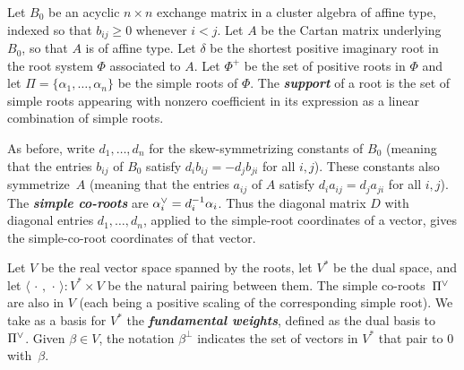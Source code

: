 \documentclass[10pt]{article}
\theoremstyle{definition}
\theoremstyle{remark}
\numberwithin{equation}{section}
\newcommand{\newword}[1]{\textbf{\emph{#1}}}
\newcommand{\ep}{\varepsilon}
\newcommand{\set}[1]{{\lbrace #1 \rbrace}}
\newcommand{\br}[1]{{\langle #1 \rangle}}
\newcommand{\ck}{\spcheck}
\newcommand{\0}{{\mathbf{0}}}
\newcommand{\tB}{{\widetilde{B}}}
\newcommand{\symmetrizer}{{D}}
\newcommand{\RSChar}{\Phi}
\newcommand{\RS}{\RSChar}
\newcommand{\RSpos}{\RS^+}
\newcommand{\SimplesChar}{\Pi}
\newcommand{\Simples}{\SimplesChar}
\begin{document}
Let $B_0$ be an acyclic $n\times n$ exchange matrix in a cluster algebra of affine type, indexed so that $b_{ij}\ge0$ whenever $i<j$.
Let $A$ be the Cartan matrix underlying $B_0$, so that $A$ is of affine type.
Let $\delta$ be the shortest positive imaginary root in the root system $\RS$ associated to $A$.
Let $\RSpos$ be the set of positive roots in $\RS$ and let $\Simples=\set{\alpha_1,\ldots,\alpha_n}$ be the simple roots of $\RS$.
The \newword{support} of a root is the set of simple roots appearing with nonzero coefficient in its expression as a linear combination of simple roots.

As before, write $d_1,\ldots,d_n$ for the skew-symmetrizing constants of $B_0$ (meaning that the entries $b_{ij}$ of $B_0$ satisfy $d_i b_{ij}=-d_j b_{ji}$ for all $i,j$).
These constants also symmetrize~$A$ (meaning that the entries $a_{ij}$ of $A$ satisfy $d_i a_{ij}=d_j a_{ji}$ for all $i,j$).
The \newword{simple co-roots} are $\alpha_i\ck= d_i^{-1} \alpha_i$. 
Thus the diagonal matrix $\symmetrizer$ with diagonal entries $d_1,\ldots,d_n$, applied to the simple-root coordinates of a vector, gives the simple-co-root coordinates of that vector.

Let $V$ be the real vector space spanned by the roots, let $V^*$ be the dual space, and let $\br{\,\cdot\,,\,\cdot\,}:V^*\times V$ be the natural pairing between them.
The simple co-roots~$\Simples\ck$ are also in $V$ (each being a positive scaling of the corresponding simple root).
We take as a basis for $V^*$ the \newword{fundamental weights}, defined as the dual basis to~$\Simples\ck$.
Given $\beta\in V$, the notation $\beta^\perp$ indicates the set of vectors in $V^*$ that pair to $0$ with~$\beta$. 
\end{document}
